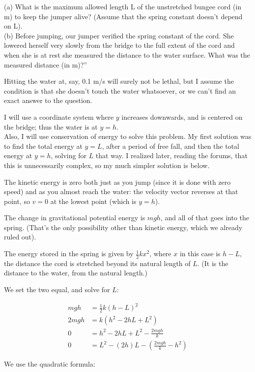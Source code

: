 \documentclass[12pt,a4paper]{report}
\begin{document}
(a) What is the maximum allowed length L of the unstretched bungee cord (in m) to keep the jumper alive? (Assume that the spring constant doesn't depend on L).\\
(b) Before jumping, our jumper verified the spring constant of the cord. She lowered herself very slowly from the bridge to the full extent of the cord and when she is at rest she measured the distance to the water surface. What was the measured distance (in m)?''

Hitting the water at, say, 0.1 m/s will surely not be lethal, but I assume the condition is that she doesn't touch the water whatsoever, or we can't find an exact answer to the question.

I will use a coordinate system where $y$ increases downwards, and is centered on the bridge; thus the water is at $y = h$.\\
Also, I will use conservation of energy to solve this problem. My first solution was to find the total energy at $y = L$, after a period of free fall, and then the total energy at $y = h$, solving for $L$ that way. I realized later, reading the forums, that this is unnecessarily complex, so my much simpler solution is below.

The kinetic energy is zero both just as you jump (since it is done with zero speed) and as you almost reach the water: the velocity vector reverses at that point, so $v = 0$ at the lowest point (which is $y = h$).

The change in gravitational potential energy is $m g h$, and all of that goes into the spring. (That's the only possibility other than kinetic energy, which we already ruled out).

The energy stored in the spring is given by $\frac{1}{2} k x^2$, where $x$ in this case is $h - L$, the distance the cord is stretched beyond its natural length of $L$. (It is the distance to the water, from the natural length.)

We set the two equal, and solve for $L$:

\begin{align}
m g h &= \frac{1}{2} k (h - L)^2\\
2 m g h &= k (h^2 -2 h L + L^2)\\
0 &= h^2 -2 h L + L^2 - \frac{2 m g h}{k}\\
0 &= L^2 - (2 h) L - \left(\frac{2 m g h}{k} - h^2\right)
\end{align}

We use the quadratic formula:
\end{document}
